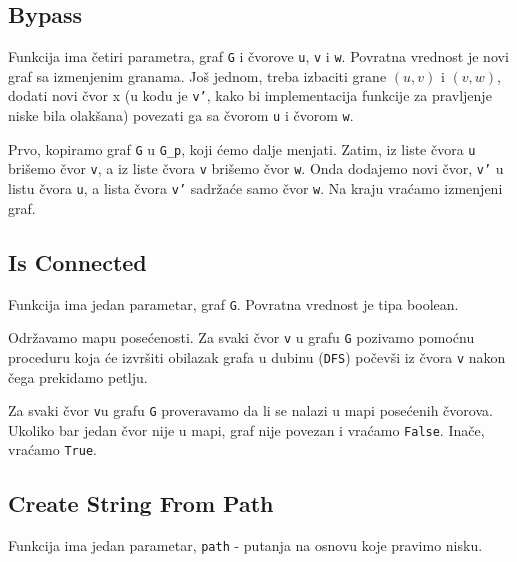 


\subsection{Bypass}
\label{bypass}

Funkcija ima četiri parametra, graf \texttt{G} i čvorove \texttt{u}, \texttt{v} i \texttt{w}. Povratna vrednost je novi graf sa izmenjenim granama. Još jednom, treba izbaciti grane $(u, v)$ i $(v, w)$, dodati novi čvor x (u kodu je \texttt{v'}, kako bi implementacija funkcije za pravljenje niske bila olakšana) povezati ga sa čvorom \texttt{u} i čvorom \texttt{w}.

Prvo, kopiramo graf \texttt{G} u \texttt{G\_p}, koji ćemo dalje menjati. Zatim, iz liste čvora \texttt{u} brišemo čvor \texttt{v}, a iz liste čvora \texttt{v} brišemo čvor \texttt{w}. Onda dodajemo novi čvor, \texttt{v'} u listu čvora \texttt{u}, a lista čvora \texttt{v'}  sadržaće samo čvor \texttt{w}. Na kraju vraćamo izmenjeni graf.





\subsection{Is Connected}
\label{isConnected}

Funkcija ima jedan parametar, graf \texttt{G}. Povratna vrednost je tipa boolean.

Održavamo mapu posećenosti. Za svaki čvor \texttt{v} u grafu \texttt{G} pozivamo pomoćnu proceduru koja će izvršiti obilazak grafa u dubinu (\texttt{DFS}) počevši iz čvora \texttt{v} nakon čega prekidamo petlju.

Za svaki čvor \texttt{v}u grafu \texttt{G} proveravamo da li se nalazi u mapi posećenih čvorova. Ukoliko bar jedan čvor nije u mapi, graf nije povezan i vraćamo \texttt{False}. Inače, vraćamo \texttt{True}.

\newpage



\subsection{Create String From Path}
\label{createStringFromPath}

Funkcija ima jedan parametar, \texttt{path} - putanja na osnovu koje pravimo nisku.

